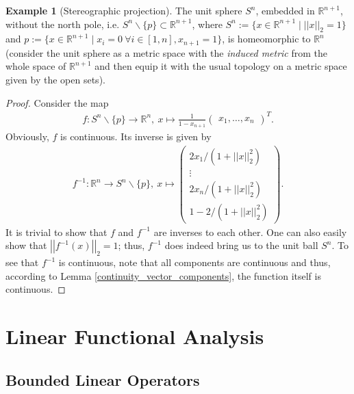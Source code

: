 \documentclass[12pt, a4paper]{article}
\numberwithin{equation}{section}
\theoremstyle{definition}
\theoremstyle{definition}
\newtheorem{exmp}[thm]{Example} %
\newcommand{\norm}[2]{\left\vert\left\vert #1 \right\vert\right\vert_{#2}}
\begin{document}
	\begin{exmp}[Stereographic projection]
		The unit sphere $S^n$, embedded in $\mathbb R^{n+1}$, without the north pole, i.e. $S^n\backslash \{p\} \subset \mathbb R^{n+1}$, where $S^n := \{ x\in\mathbb R^{n+1} \mid \norm{x}{2} = 1 \}$ and $p := \{ x\in\mathbb R^{n+1} \mid x_i = 0 \ \forall i\in[1, n], x_{n+1} = 1 \}$, is homeomorphic to $\mathbb R^n$ (consider the unit sphere as a metric space with the \textit{induced metric} from the whole space of $\mathbb R^{n+1}$ and then equip it with the usual topology on a metric space given by the open sets). 
	\end{exmp}
	\begin{proof}
			Consider the map 
		\begin{align}
			f: S^n\backslash\{p\}\rightarrow \mathbb R^n, \ x\mapsto \frac{1}{1-x_{n+1}}\begin{pmatrix} x_1, \dots, x_n \end{pmatrix}^T. 
		\end{align}
		Obviously, $f$ is continuous. Its inverse is given by 
		\begin{align}\label{stereographic_map_inverse}
			f^{-1}: \mathbb R^n \rightarrow S^n\backslash\{p\}, \ x\mapsto \begin{pmatrix} 2x_1/ \left(1+\norm{x}{2}^2\right)\\ \vdots\\ 2x_n/\left(1+\norm{x}{2}^2\right) \\[4pt] 1-2/\left(1+\norm{x}{2}^2\right) \end{pmatrix}.  
		\end{align}
		It is trivial to show that $f$ and $f^{-1}$ are inverses to each other. One can also easily show that $\norm{f^{-1}(x)}{2} = 1$; thus, $f^{-1}$ does indeed bring us to the unit ball $S^n$. 
		To see that $f^{-1}$ is continuous, note that all components are continuous and thus, according to Lemma \ref{continuity_vector_components}, the function itself is continuous. 
	\end{proof} 
	
	\newpage 
	\section{Linear Functional Analysis}

	\subsection{Bounded Linear Operators}
\end{document}
